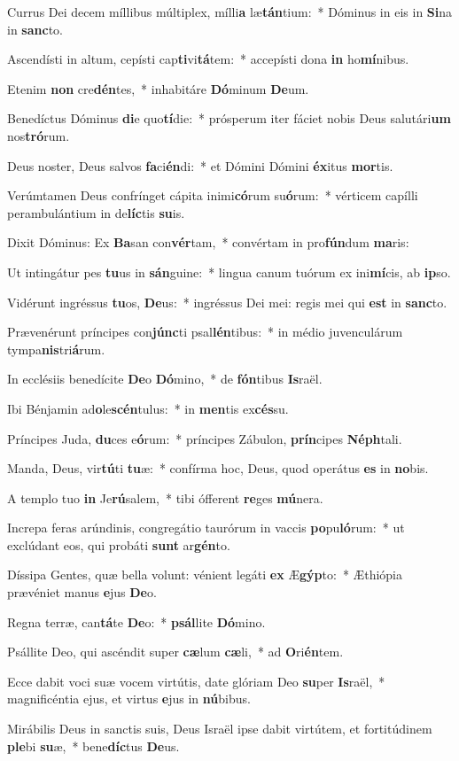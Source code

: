 \item Currus Dei decem míllibus múltiplex, mílli\textbf{a} læ\textbf{tán}tium:~* Dóminus in eis in \textbf{Si}na in \textbf{sanc}to.
\item Ascendísti in altum, cepísti cap\textbf{ti}vi\textbf{tá}tem:~* accepísti dona \textbf{in} ho\textbf{mí}nibus.
\item Etenim \textbf{non} cre\textbf{dén}tes,~* inhabitáre \textbf{Dó}minum \textbf{De}um.
\item Benedíctus Dóminus \textbf{di}e quo\textbf{tí}die:~* prósperum iter fáciet nobis Deus salutári\textbf{um} nos\textbf{tró}rum.
\item Deus noster, Deus salvos \textbf{fa}ci\textbf{én}di:~* et Dómini Dómini \textbf{éx}itus \textbf{mor}tis.
\item Verúmtamen Deus confrínget cápita inimi\textbf{có}rum su\textbf{ó}rum:~* vérticem capílli perambulántium in de\textbf{líc}tis \textbf{su}is.
\item Dixit Dóminus: Ex \textbf{Ba}san con\textbf{vér}tam,~* convértam in pro\textbf{fún}dum \textbf{ma}ris:
\item Ut intingátur pes \textbf{tu}us in \textbf{sán}guine:~* lingua canum tuórum ex ini\textbf{mí}cis, ab \textbf{ip}so.
\item Vidérunt ingréssus \textbf{tu}os, \textbf{De}us:~* ingréssus Dei mei: regis mei qui \textbf{est} in \textbf{sanc}to.
\item Prævenérunt príncipes con\textbf{júnc}ti psal\textbf{lén}tibus:~* in médio juvenculárum tympa\textbf{nis}tri\textbf{á}rum.
\item In ecclésiis benedícite \textbf{De}o \textbf{Dó}mino,~* de \textbf{fón}tibus \textbf{Is}raël.
\item Ibi Bénjamin ad\textbf{o}le\textbf{scén}tulus:~* in \textbf{men}tis ex\textbf{cés}su.
\item Príncipes Juda, \textbf{du}ces e\textbf{ó}rum:~* príncipes Zábulon, \textbf{prín}cipes \textbf{Néph}tali.
\item Manda, Deus, vir\textbf{tú}ti \textbf{tu}æ:~* confírma hoc, Deus, quod operátus \textbf{es} in \textbf{no}bis.
\item A templo tuo \textbf{in} Je\textbf{rú}salem,~* tibi ófferent \textbf{re}ges \textbf{mú}nera.
\item Increpa feras arúndinis, congregátio taurórum in vaccis \textbf{po}pu\textbf{ló}rum:~* ut exclúdant eos, qui probáti \textbf{sunt} ar\textbf{gén}to.
\item Díssipa Gentes, quæ bella volunt: vénient legáti \textbf{ex} Æ\textbf{gýp}to:~* Æthiópia prævéniet manus \textbf{e}jus \textbf{De}o.
\item Regna terræ, can\textbf{tá}te \textbf{De}o:~* \textbf{psál}lite \textbf{Dó}mino.
\item Psállite Deo, qui ascéndit super \textbf{cæ}lum \textbf{cæ}li,~* ad \textbf{O}ri\textbf{én}tem.
\item Ecce dabit voci suæ vocem virtútis, date glóriam Deo \textbf{su}per \textbf{Is}raël,~* magnificéntia ejus, et virtus \textbf{e}jus in \textbf{nú}bibus.
\item Mirábilis Deus in sanctis suis, Deus Israël ipse dabit virtútem, et fortitúdinem \textbf{ple}bi \textbf{su}æ,~* bene\textbf{díc}tus \textbf{De}us.
